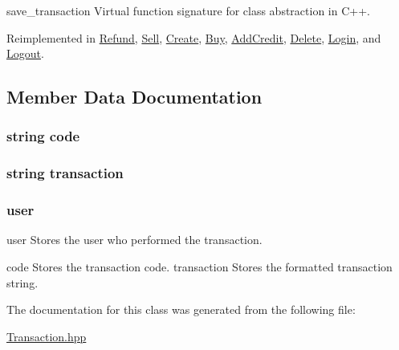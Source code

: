 save\-\_\-transaction Virtual function signature for class abstraction in C++. 



Reimplemented in \hyperlink{class_refund_a8e5996ad33eb07eef44f55deba6c298e}{Refund}, \hyperlink{class_sell_a8e5996ad33eb07eef44f55deba6c298e}{Sell}, \hyperlink{class_create_a8e5996ad33eb07eef44f55deba6c298e}{Create}, \hyperlink{class_buy_a8e5996ad33eb07eef44f55deba6c298e}{Buy}, \hyperlink{class_add_credit_a8e5996ad33eb07eef44f55deba6c298e}{Add\-Credit}, \hyperlink{class_delete_a8e5996ad33eb07eef44f55deba6c298e}{Delete}, \hyperlink{class_login_a8e5996ad33eb07eef44f55deba6c298e}{Login}, and \hyperlink{class_logout_a8e5996ad33eb07eef44f55deba6c298e}{Logout}.



\subsection{Member Data Documentation}
\hypertarget{class_transaction_abbc0a016a8f13d797228d020eb94a769}{
\subsubsection[{code}]{\setlength{\rightskip}{0pt plus 5cm}string code\hspace{0.3cm}{\ttfamily [protected]}}}\label{class_transaction_abbc0a016a8f13d797228d020eb94a769}
\hypertarget{class_transaction_a84f993feb07edc9840cb7f375b7bf1c3}{
\subsubsection[{transaction}]{\setlength{\rightskip}{0pt plus 5cm}string transaction\hspace{0.3cm}{\ttfamily [protected]}}}\label{class_transaction_a84f993feb07edc9840cb7f375b7bf1c3}
\hypertarget{class_transaction_a7ffd636d88d39d8b4366d5423d352b0b}{
\subsubsection[{user}]{ user\hspace{0.3cm}{\ttfamily [protected]}}}\label{class_transaction_a7ffd636d88d39d8b4366d5423d352b0b}


user Stores the user who performed the transaction. 

code Stores the transaction code. transaction Stores the formatted transaction string. 

The documentation for this class was generated from the following file\-:\begin{DoxyCompactItemize}
\item 
\hyperlink{_transaction_8hpp}{Transaction.\-hpp}\end{DoxyCompactItemize}
